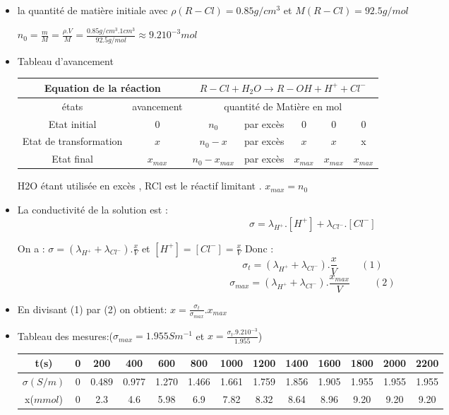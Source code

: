 \documentclass[12pt]{article}
\begin{document}
\begin{itemize}
\item la quantité de matière initiale avec $\rho(R-Cl) = 0.85g/cm^3$ et $M(R-Cl) = 92.5 g/mol$  

	$n_0 = \frac{m}{M} =\frac{\rho.V}{M} = \frac{0.85g/cm^3 . 1cm^3}{92.5 g/mol} \approx 9.2 10^{-3} mol$
\item Tableau d'avancement

\begin{tabular}{|c|c|c|c|c|c|c|}
    \hline
	\multicolumn{2}{|c|}{Equation de la réaction}& \multicolumn{5}{c|}{$ R-Cl + H_2O \rightarrow  R-OH + H^++ Cl^-$}\\\hline
    états  & avancement& \multicolumn{5}{|c|}{quantité de Matière en mol}\\\hline
	Etat initial          &    0    & $ n_0$   & par excès  & $ 0$     & $ 0$ &0 \\\hline
	Etat de transformation&    $x$  & $ n_0- x$ & par excès& $ x$        & $ x$&x \\\hline
	Etat final            &$x_{max}$& $ n_0-x_{max}$ & par excès& $x_{max}$  & $  x_{max}$& $  x_{max}$\\\hline
\end{tabular}

H2O étant utilisée en excès , RCl est le réactif limitant . $x_{max} = n_0$

\item La conductivité de la solution est : $$\sigma = \lambda_{H^+}.[H^+] + \lambda_{Cl^-}.[Cl^-]$$

	On a : $\sigma = (\lambda_{H^+} + \lambda_{Cl^-}).\frac{x}{V}$ et $[H^+]= [Cl^-] =\frac{x}{V}$ 
	Donc : $$\sigma_t = (\lambda_{H^+} + \lambda_{Cl^-}).\frac{x}{V} \hspace{1cm} (1) $$
$$\sigma_{max} = (\lambda_{H^+} + \lambda_{Cl^-}).\frac{x_{max}}{V} \hspace{1cm}  (2)$$

\item En divisant (1) par (2) on obtient: $x = \frac{\sigma_t}{\sigma_{max}}. x_{max}$

\item Tableau des mesures:($\sigma_{max}=1.955Sm^{-1}$ et $x=\frac{\sigma_t.9.210^{-3}}{1.955}$) 

\begin{center}
   \begin{tabular}{|c|c|c|c|c|c|c|c|c|c|c|c|c|}
	  \hline
	  t(s)         &0&200  &400  &600  &800  &1000 &1200 &1400 &1600 &1800 &2000&2200 \\\hline
	  $\sigma(S/m)$&0&0.489&0.977&1.270&1.466&1.661&1.759&1.856&1.905&1.955&1.955&1.955\\\hline
	  x($mmol$)    &0&2.3  &4.6  &5.98 &6.9  &7.82 &8.32 &8.64 &8.96 &9.20 &9.20& 9.20\\\hline
   \end{tabular}
\end{center}
\end{itemize}
\end{document}

